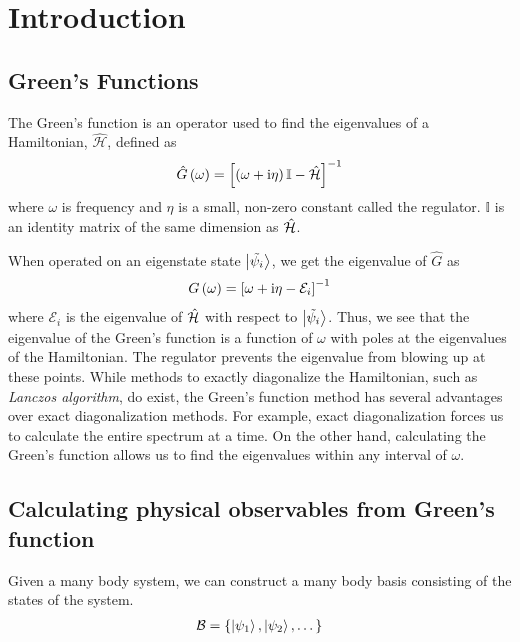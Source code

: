 \chapter{\label{intro}Introduction}

\setcounter{equation}{0}
\setcounter{table}{0}
\setcounter{figure}{0}

\section{Green's Functions}
	The Green's function is an operator used to find the eigenvalues of a  Hamiltonian, $ \hat{\mathcal{H}} $, defined as
	\begin{align}
		\hat{G}\left(\omega\right) = \left[ \left( \omega + \mathrm{i} \eta\right) \mathbb{I} - \hat{\mathcal{H}} \right]^{-1}
	\end{align}
	where $ \omega $ is frequency and $ \eta $ is a small, non-zero constant called the regulator. $ \mathbb{I} $ is an identity matrix of the same dimension as $ \hat{\mathcal{H}} $.
	
	When operated on an eigenstate state $ \ket{\tilde{\psi_i}} $, we get the eigenvalue of $ \hat{G} $ as
	\begin{align}
		G\left(\omega\right) = \left[ \omega + \mathrm{i} \eta - \mathcal{E}_i \right]^{-1}
	\end{align}
	where $ \mathcal{E}_i $ is the eigenvalue of $ \hat{\mathcal{H}} $ with respect to $ \ket{\tilde{\psi_i}} $. Thus, we see that the eigenvalue of the Green's function is a function of $ \omega $ with poles at the eigenvalues of the Hamiltonian. The regulator prevents the eigenvalue from blowing up at these points. While methods to exactly diagonalize the Hamiltonian, such as \textit{Lanczos algorithm}, do exist, the Green's function method has several advantages over exact diagonalization methods. For example, exact diagonalization forces us to calculate the entire spectrum at a time. On the other hand, calculating the Green's function allows us to find the eigenvalues within any interval of $\omega$.
    
\section{Calculating physical observables from Green's function}
	Given a many body system, we can construct a many body basis consisting of the states of the system.
	\begin{align}
		\mathcal{B} = \{ \ket{\psi_1}, \ket{\psi_2}, \dots \}
	\end{align} 
	
